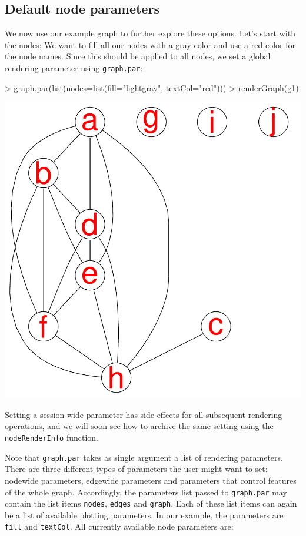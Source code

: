 \documentclass{article}
\newcommand{\Rfunction}[1]{{\texttt{#1}}}
\newcommand{\Robject}[1]{{\texttt{#1}}}
\begin{document}
\subsection{Default node parameters}
We now use our example graph to further explore these options. Let's
start with the nodes: We want to fill all our nodes with a gray color
and use a red color for the node names. Since this should be applied
to all nodes, we set a global rendering parameter using
\Rfunction{graph.par}:
\begin{Schunk}
\begin{Sinput}
> graph.par(list(nodes=list(fill="lightgray", textCol="red")))
> renderGraph(g1)
\end{Sinput}
\end{Schunk}
\includegraphics{newRgraphvizInterface-bgandfontcol}

Setting a session-wide parameter has side-effects for all subsequent
rendering operations, and we will soon see how to archive the same
setting using the \Rfunction{nodeRenderInfo} function. 

Note that \Rfunction{graph.par} takes as single argument a list of
rendering parameters. There are three different types of parameters
the user might want to set: nodewide parameters, edgewide parameters
and parameters that control features of the whole graph. Accordingly,
the parameters list passed to \Rfunction{graph.par} may contain the
list items \Robject{nodes}, \Robject{edges} and \Robject{graph}. Each
of these list items can again be a list of available plotting
parameters. In our example, the parameters are \Robject{fill} and
\Robject{textCol}. All currently available node parameters are:
\end{document}
